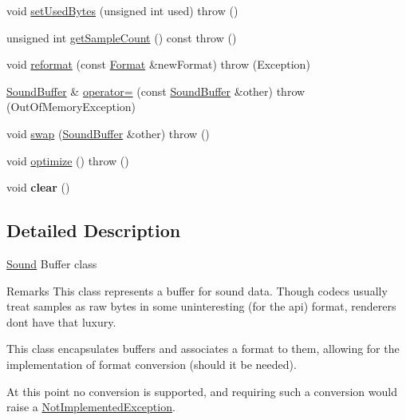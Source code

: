 \begin{DoxyCompactItemize}
\item 
void \hyperlink{classAudio_1_1SoundBuffer_a03ebbf6341feeb181b83c9a8283301d8}{set\+Used\+Bytes} (unsigned int used)  throw ()
\item 
unsigned int \hyperlink{classAudio_1_1SoundBuffer_a3e6c9dbe854b6c538cf9c730e8818a94}{get\+Sample\+Count} () const   throw ()
\item 
void \hyperlink{classAudio_1_1SoundBuffer_ab3b882f2f49e9a6361677fa949b4f715}{reformat} (const \hyperlink{structAudio_1_1Format}{Format} \&new\+Format)  throw (\+Exception)
\item 
\hyperlink{classAudio_1_1SoundBuffer}{Sound\+Buffer} \& \hyperlink{classAudio_1_1SoundBuffer_a26b0a191447c9f1e2558a528160ca1e7}{operator=} (const \hyperlink{classAudio_1_1SoundBuffer}{Sound\+Buffer} \&other)  throw (\+Out\+Of\+Memory\+Exception)
\item 
void \hyperlink{classAudio_1_1SoundBuffer_ac79d65c98187412b6c9bd727a14385fb}{swap} (\hyperlink{classAudio_1_1SoundBuffer}{Sound\+Buffer} \&other)  throw ()
\item 
void \hyperlink{classAudio_1_1SoundBuffer_a30de6438a4df9edfa9deb6f211cbc2d1}{optimize} ()  throw ()
\item 
void {\bfseries clear} ()\hypertarget{classAudio_1_1SoundBuffer_a5d6c4b64108c47be57ffac8316f0eb2e}{}\label{classAudio_1_1SoundBuffer_a5d6c4b64108c47be57ffac8316f0eb2e}

\end{DoxyCompactItemize}


\subsection{Detailed Description}
\hyperlink{classAudio_1_1Sound}{Sound} Buffer class

\begin{DoxyRemark}{Remarks}
This class represents a buffer for sound data. Though codecs usually treat samples as raw bytes in some uninteresting (for the api) format, renderers don\textquotesingle{}t have that luxury. 
\end{DoxyRemark}
\begin{DoxyParagraph}{This class encapsulates buffers and associates a format to them,}
allowing for the implementation of format conversion (should it be needed). 
\end{DoxyParagraph}
\begin{DoxyParagraph}{At this point no conversion is supported, and requiring such}
a conversion would raise a \hyperlink{classAudio_1_1NotImplementedException}{Not\+Implemented\+Exception}. 
\end{DoxyParagraph}


